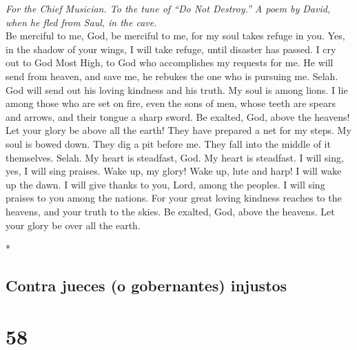 \begin{paracol}{2}
\begin{otherlanguage}{english}
\emph{For the Chief Musician. To the tune of ``Do Not Destroy.'' A poem
by David, when he fled from Saul, in the cave.}\\
 Be merciful to me, God, be merciful to me, for my soul
takes refuge in you. Yes, in the shadow of your wings, I will take
refuge, until disaster has passed.  I cry out to God Most
High, to God who accomplishes my requests for me.  He will
send from heaven, and save me, he rebukes the one who is pursuing me.
Selah. God will send out his loving kindness and his truth.
 My soul is among lions. I lie among those who are set on
fire, even the sons of men, whose teeth are spears and arrows, and their
tongue a sharp sword.  Be exalted, God, above the heavens!
Let your glory be above all the earth!  They have prepared
a net for my steps. My soul is bowed down. They dig a pit before me.
They fall into the middle of it themselves. Selah.  My
heart is steadfast, God. My heart is steadfast. I will sing, yes, I will
sing praises.  Wake up, my glory! Wake up, lute and harp!
I will wake up the dawn.  I will give thanks to you, Lord,
among the peoples. I will sing praises to you among the nations.
 For your great loving kindness reaches to the heavens,
and your truth to the skies.  Be exalted, God, above the
heavens. Let your glory be over all the earth.

\end{otherlanguage}

\switchcolumn[0]*

\hypertarget{contra-jueces-o-gobernantes-injustos}{%
\subsection{Contra jueces (o gobernantes)
injustos}\label{contra-jueces-o-gobernantes-injustos}}

\hypertarget{section-114}{%
\section{58}\label{section-114}}


\end{paracol}

